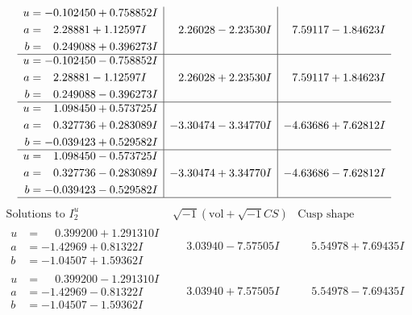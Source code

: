 \documentclass[1p]{elsarticle_modified}
\theoremstyle{definition}
\newcommand{\I}{\sqrt{-1}}
\begin{document}
$$\begin{array}{c|c|c}
\begin{aligned}
u &= -0.102450 + 0.758852 I \\
a &= \phantom{-}2.28881 + 1.12597 I \\
b &= \phantom{-}0.249088 + 0.396273 I\end{aligned}
 & \phantom{-}2.26028 - 2.23530 I & \phantom{-}7.59117 - 1.84623 I \\ \hline\begin{aligned}
u &= -0.102450 - 0.758852 I \\
a &= \phantom{-}2.28881 - 1.12597 I \\
b &= \phantom{-}0.249088 - 0.396273 I\end{aligned}
 & \phantom{-}2.26028 + 2.23530 I & \phantom{-}7.59117 + 1.84623 I \\ \hline\begin{aligned}
u &= \phantom{-}1.098450 + 0.573725 I \\
a &= \phantom{-}0.327736 + 0.283089 I \\
b &= -0.039423 + 0.529582 I\end{aligned}
 & -3.30474 - 3.34770 I & -4.63686 + 7.62812 I \\ \hline\begin{aligned}
u &= \phantom{-}1.098450 - 0.573725 I \\
a &= \phantom{-}0.327736 - 0.283089 I \\
b &= -0.039423 - 0.529582 I\end{aligned}
 & -3.30474 + 3.34770 I & -4.63686 - 7.62812 I\\
 \hline 
 \end{array}$$\newpage$$\begin{array}{c|c|c}  
\text{Solutions to }I^u_{2}& \I (\text{vol} + \sqrt{-1}CS) & \text{Cusp shape}\\
 \hline 
\begin{aligned}
u &= \phantom{-}0.399200 + 1.291310 I \\
a &= -1.42969 + 0.81322 I \\
b &= -1.04507 + 1.59362 I\end{aligned}
 & \phantom{-}3.03940 - 7.57505 I & \phantom{-}5.54978 + 7.69435 I \\ \hline\begin{aligned}
u &= \phantom{-}0.399200 - 1.291310 I \\
a &= -1.42969 - 0.81322 I \\
b &= -1.04507 - 1.59362 I\end{aligned}
 & \phantom{-}3.03940 + 7.57505 I & \phantom{-}5.54978 - 7.69435 I \\ \hline\begin{aligned}

\end{aligned}
\end{array}$$
\end{document}
